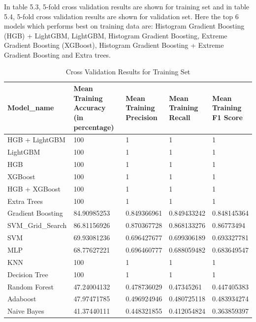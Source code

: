 In table 5.3, 5-fold cross validation results are shown for training set and in table 5.4, 5-fold cross validation results are shown for validation set. Here the top 6 models which performs best on training data are: Histogram Gradient Boosting (HGB) + LightGBM, LightGBM, Histogram Gradient Boosting, Extreme Gradient Boosting (XGBoost), Histogram Gradient Boosting + Extreme Gradient Boosting and Extra trees. 

\begin{table}[!ht]
    \centering
    \caption{Cross Validation Results for Training Set}
    \begin{tabular}{|l|l|l|l|l|}
    \hline
        Model\_name & \makecell{Mean\\ Training\\ Accuracy\\ (in percentage)} & \makecell{Mean\\ Training\\ Precision} & \makecell{Mean\\ Training\\ Recall} & \makecell{Mean\\ Training\\ F1 Score} \\ \hline
        HGB + LightGBM & 100 & 1 & 1 & 1 \\ \hline
        LightGBM & 100 & 1 & 1 & 1 \\ \hline
        HGB & 100 & 1 & 1 & 1 \\ \hline
        XGBoost & 100 & 1 & 1 & 1 \\ \hline
        HGB + XGBoost & 100 & 1 & 1 & 1 \\ \hline
        Extra Trees & 100 & 1 & 1 & 1 \\ \hline
        Gradient Boosting & 84.90985253 & 0.849366961 & 0.849433242 & 0.848145364 \\ \hline
        SVM\_Grid\_Search & 86.81156926 & 0.870367728 & 0.868133276 & 0.86773494 \\ \hline
        SVM & 69.93081236 & 0.696427677 & 0.699306189 & 0.693327781 \\ \hline
        MLP & 68.77627221 & 0.696460777 & 0.688059482 & 0.683649547 \\ \hline
        KNN & 100 & 1 & 1 & 1 \\ \hline
        Decision Tree & 100 & 1 & 1 & 1 \\ \hline
        Random Forest & 47.24004132 & 0.478736029 & 0.47345261 & 0.447405383 \\ \hline
        Adaboost & 47.97471785 & 0.496924946 & 0.480725118 & 0.483934274 \\ \hline
        Naive Bayes & 41.37440111 & 0.448321855 & 0.412054824 & 0.363859397 \\ \hline
    \end{tabular}
\end{table}

